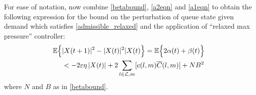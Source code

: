 For ease of notation, now combine \eqref{betabound}, \eqref{a2eqn} and \eqref{a1eqn} to obtain the following expression for the bound on the perturbation of queue state given demand which satisfies \eqref{admissible_relaxed} and the application of ``relaxed max pressure'' controller:
\begin{align}
\mathbb{E}\Big\{ &|X(t+1)|^{2} - |X(t)|^{2}  |   X(t) \Big\} = \mathbb{E}\Big\{ 2\alpha(t) + \beta(t) \Big\} \nonumber \\
&<  -2\varepsilon \eta \left| X(t ) \right| + 2 \sum_{l \in \mathcal{L},m} [c(l,m)\overline{C} (l,m) ]+ NB^{2}
\end{align}
where $N$ and $B$ as in \eqref{betabound}. 

%













